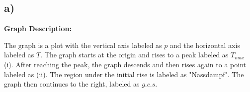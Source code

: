 

\subsection*{a)}

\begin{center}
\textbf{Graph Description:}
\end{center}

The graph is a plot with the vertical axis labeled as \( p \) and the horizontal axis labeled as \( T \). The graph starts at the origin and rises to a peak labeled as \( T_{max} \) (i). After reaching the peak, the graph descends and then rises again to a point labeled as (ii). The region under the initial rise is labeled as "Nassdampf". The graph then continues to the right, labeled as \( g.c.s \).